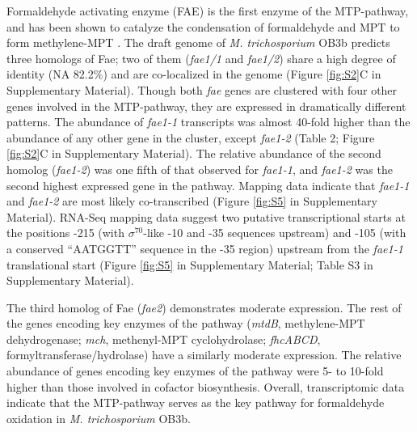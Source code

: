 Formaldehyde activating enzyme (FAE) is the first enzyme of the MTP-pathway, and has been shown to catalyze the condensation of formaldehyde and MPT to form methylene-MPT \cite{vorholt2000}.
The draft genome of \textit{M. trichosporium} OB3b predicts three homologs of Fae; two of them (\textit{fae1/1} and \textit{fae1/2}) share a high degree of identity (NA 82.2\%) and are co-localized in the genome (Figure \ref{fig:S2}C in Supplementary Material).
Though both \textit{fae} genes are clustered with four other genes involved in the MTP-pathway, they are expressed in dramatically different patterns.
The abundance of \textit{fae1-1} transcripts was almost 40-fold higher than the abundance of any other gene in the cluster, except \textit{fae1-2} (Table 2; Figure \ref{fig:S2}C in Supplementary Material).
The relative abundance of the second homolog (\textit{fae1-2}) was one fifth of that observed for \textit{fae1-1}, and \textit{fae1-2} was the second highest expressed gene in the pathway.
Mapping data indicate that \textit{fae1-1} and \textit{fae1-2} are most likely co-transcribed (Figure \ref{fig:S5} in Supplementary Material).
RNA-Seq mapping data suggest two putative transcriptional starts at the positions -215 (with $\sigma^{70}$-like -10 and -35 sequences upstream) and -105 (with a conserved ``AATGGTT'' sequence in the -35 region) upstream from the \textit{fae1-1} translational start (Figure \ref{fig:S5} in Supplementary Material; Table S3 in Supplementary Material).

The third homolog of Fae (\textit{fae2}) demonstrates moderate expression.
The rest of the genes encoding key enzymes of the pathway (\textit{mtdB}, methylene-MPT dehydrogenase; \textit{mch}, methenyl-MPT cyclohydrolase; \textit{fhcABCD}, formyltransferase/hydrolase) have a similarly moderate expression.
The relative abundance of genes encoding key enzymes of the pathway were 5- to 10-fold higher than those involved in cofactor biosynthesis.
Overall, transcriptomic data indicate that the MTP-pathway serves as the key pathway for formaldehyde oxidation in \textit{M. trichosporium} OB3b.

